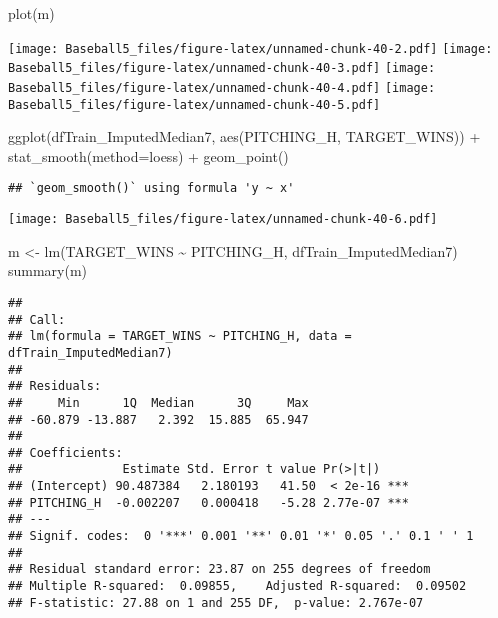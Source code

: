 \documentclass[
]{article}
\newenvironment{Shaded}{\begin{snugshade}}{\end{snugshade}}
\newcommand{\AttributeTok}[1]{\textcolor[rgb]{0.77,0.63,0.00}{#1}}
\newcommand{\FunctionTok}[1]{\textcolor[rgb]{0.00,0.00,0.00}{#1}}
\newcommand{\NormalTok}[1]{#1}
\newcommand{\OtherTok}[1]{\textcolor[rgb]{0.56,0.35,0.01}{#1}}
\newcommand{\SpecialCharTok}[1]{\textcolor[rgb]{0.00,0.00,0.00}{#1}}
\begin{document}
\begin{Shaded}
\begin{Highlighting}[]
\FunctionTok{plot}\NormalTok{(m)}
\end{Highlighting}
\end{Shaded}

\texttt{[image: Baseball5\_files/figure-latex/unnamed-chunk-40-2.pdf]}
\texttt{[image: Baseball5\_files/figure-latex/unnamed-chunk-40-3.pdf]}
\texttt{[image: Baseball5\_files/figure-latex/unnamed-chunk-40-4.pdf]}
\texttt{[image: Baseball5\_files/figure-latex/unnamed-chunk-40-5.pdf]}

\begin{Shaded}
\begin{Highlighting}[]
\FunctionTok{ggplot}\NormalTok{(dfTrain\_ImputedMedian7, }\FunctionTok{aes}\NormalTok{(PITCHING\_H, TARGET\_WINS)) }\SpecialCharTok{+}
          \FunctionTok{stat\_smooth}\NormalTok{(}\AttributeTok{method=}\NormalTok{loess) }\SpecialCharTok{+}
          \FunctionTok{geom\_point}\NormalTok{()}
\end{Highlighting}
\end{Shaded}

\begin{verbatim}
## `geom_smooth()` using formula 'y ~ x'
\end{verbatim}

\texttt{[image: Baseball5\_files/figure-latex/unnamed-chunk-40-6.pdf]}

\begin{Shaded}
\begin{Highlighting}[]
\NormalTok{m }\OtherTok{\textless{}{-}} \FunctionTok{lm}\NormalTok{(TARGET\_WINS }\SpecialCharTok{\textasciitilde{}}\NormalTok{ PITCHING\_H, dfTrain\_ImputedMedian7)}
\FunctionTok{summary}\NormalTok{(m)}
\end{Highlighting}
\end{Shaded}

\begin{verbatim}
## 
## Call:
## lm(formula = TARGET_WINS ~ PITCHING_H, data = dfTrain_ImputedMedian7)
## 
## Residuals:
##     Min      1Q  Median      3Q     Max 
## -60.879 -13.887   2.392  15.885  65.947 
## 
## Coefficients:
##              Estimate Std. Error t value Pr(>|t|)    
## (Intercept) 90.487384   2.180193   41.50  < 2e-16 ***
## PITCHING_H  -0.002207   0.000418   -5.28 2.77e-07 ***
## ---
## Signif. codes:  0 '***' 0.001 '**' 0.01 '*' 0.05 '.' 0.1 ' ' 1
## 
## Residual standard error: 23.87 on 255 degrees of freedom
## Multiple R-squared:  0.09855,    Adjusted R-squared:  0.09502 
## F-statistic: 27.88 on 1 and 255 DF,  p-value: 2.767e-07
\end{verbatim}
\end{document}

